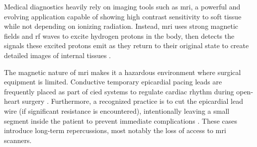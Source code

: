 

















Medical diagnostics heavily rely on imaging tools such as \gls{mri}, a powerful and evolving application capable of showing high contrast sensitivity to soft tissue while not depending on ionizing radiation. Instead, \gls{mri} uses strong magnetic fields and \gls{rf} waves to excite hydrogen protons in the body, then detects the signals these excited protons emit as they return to their original state to create detailed images of internal tissues \cite{bushberg2011}. 

The magnetic nature of \gls{mri} makes it a hazardous environment where surgical equipment is limited. Conductive temporary epicardial pacing leads are frequently placed as part of \gls{cied} systems to regulate cardiac rhythm during open-heart surgery \cite{Haggani_CCPDRT_ch4_2011}. Furthermore, a recognized practice is to cut the epicardial lead wire (if significant resistance is encountered), intentionally leaving a small segment inside the patient to prevent immediate complications \cite{Mubarak:2023aa,PSA_Advisory_2006,reade2007}. These cases introduce long-term repercussions, most notably the loss of access to \gls{mri} scanners. 

